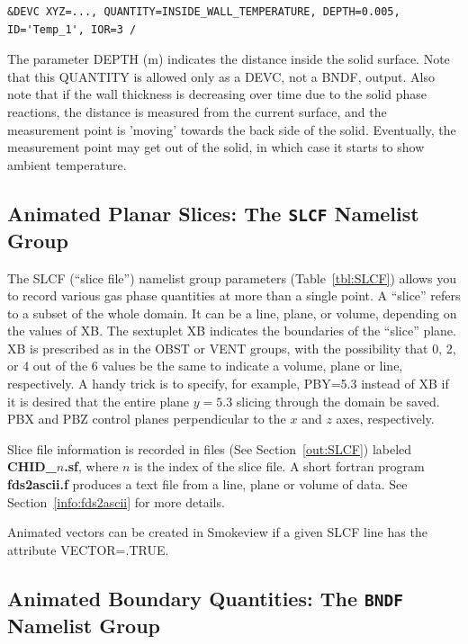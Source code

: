 \documentclass[11pt]{book}
\begin{document}
\footnotesize
\begin{verbatim}
&DEVC XYZ=..., QUANTITY=INSIDE_WALL_TEMPERATURE, DEPTH=0.005, ID='Temp_1', IOR=3 /
\end{verbatim} \normalsize

\noindent
The parameter {\ct DEPTH} (m) indicates the distance inside the solid surface.
Note that this {\ct QUANTITY} is allowed only as a {\ct DEVC}, not a
{\ct BNDF}, output. Also note that if the wall thickness is decreasing
over time due to the solid phase reactions, the distance is
measured from the current surface, and the measurement point is
'moving' towards the back side of the solid. Eventually, the
measurement point may get out of the solid, in which case it starts to
show ambient temperature.


\subsection{Animated Planar Slices: The \texorpdfstring{{\tt SLCF}}{SLCF} Namelist Group}%
\label{info:SLCF}

The {\ct SLCF} (``slice file'') namelist group parameters (Table~\ref{tbl:SLCF})
allows you to record various gas phase quantities
at more than a single point. A ``slice'' refers to a subset of the whole domain. It can be a line,
plane, or volume, depending on the values of {\ct XB}.
The sextuplet {\ct XB} indicates the boundaries of the ``slice'' plane.
{\ct XB} is prescribed as in the {\ct OBST} or {\ct VENT} groups, with
the possibility that 0, 2, or 4 out of the 6 values be the same to
indicate a volume, plane or line, respectively. A handy trick is to
specify, for example, {\ct PBY=5.3} instead of {\ct XB} if it is desired
that the entire plane $y=5.3$ slicing through the domain be saved.
{\ct PBX} and {\ct PBZ} control planes perpendicular to the
$x$ and $z$ axes, respectively.

Slice file information is recorded in files (See Section~\ref{out:SLCF})
labeled {\bf CHID\_$n$.sf}, where $n$ is the index of the slice file.
A short fortran program {\bf fds2ascii.f} produces a text file from a line,
plane or volume of data. See Section~\ref{info:fds2ascii} for more details.

Animated vectors can be created in Smokeview if a given {\ct SLCF} line has the attribute {\ct VECTOR=.TRUE.}




\subsection{Animated Boundary Quantities: The \texorpdfstring{{\tt BNDF}}{BNDF} Namelist Group}%
\label{info:BNDF}
\end{document}
